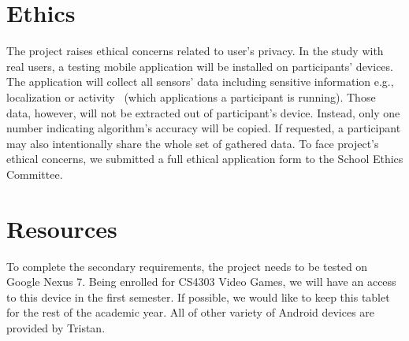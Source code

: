 \documentclass[a4page]{article}
\begin{document}
\section{Ethics}
	The project raises ethical concerns related to user's privacy. In the study with real users, a testing mobile application will be installed on participants' devices. The application will collect all sensors' data including sensitive information e.g., localization or activity~ (which applications a participant is running). Those data, however, will not be extracted out of participant's device. Instead, only one number indicating algorithm's accuracy will be copied. If requested, a participant may also intentionally share the whole set of gathered data. To face project's ethical concerns, we submitted a full ethical application form to the School Ethics Committee.
    
\section{Resources}
To complete the secondary requirements, the project needs to be tested on Google Nexus 7. Being enrolled for CS4303 Video Games, we will have an access to this device in the first semester. If possible, we would like to keep this tablet for the rest of the academic year. All of other variety of Android devices are provided by Tristan.


\end{document}
